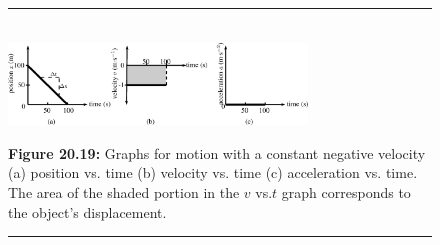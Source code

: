     \setcounter{subfigure}{0}


	\begin{figure}[H] %
    \begin{center}
    \rule[.1in]{\figurerulewidth}{.005in} \\
        \label{m38795*uid93!!!underscore!!!media}\label{m38795*uid93!!!underscore!!!printimage}\includegraphics[width=300px]{col11305.imgs/m38795_PG10C2_024.png} %
        
      \vspace{2pt}
    \vspace{\rubberspace}\par \begin{cnxcaption}
	  \small \textbf{Figure 20.19: }Graphs for motion with a constant negative velocity (a) position vs. time (b) velocity vs. time (c) acceleration vs. time. The area of the shaded portion in the \begin{math}v\end{math} vs.\begin{math}t\end{math} graph corresponds to the object's displacement.
	\end{cnxcaption}
      
    \vspace{.1in}
    \rule[.1in]{\figurerulewidth}{.005in} \\
        
    \end{center}

 \end{figure}   

    \addtocounter{footnote}{-0}
    
